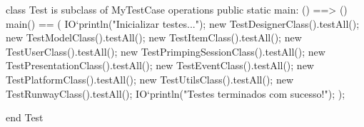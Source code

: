 \begin{vdmpp}[breaklines=true]
class Test is subclass of MyTestCase
operations
public static main: () ==> ()
 main() == (
 IO`println("Inicializar testes...");
  new TestDesignerClass().testAll();
  new TestModelClass().testAll();
  new TestItemClass().testAll();
  new TestUserClass().testAll();
  new TestPrimpingSessionClass().testAll();
  new TestPresentationClass().testAll();
  new TestEventClass().testAll();
  new TestPlatformClass().testAll();
  new TestUtilsClass().testAll();  
  new TestRunwayClass().testAll();
  IO`println("Testes terminados com sucesso!");
 );

end Test
\end{vdmpp}

